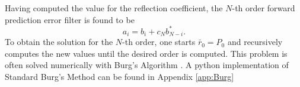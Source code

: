 \documentclass[twocolumn,showpacs,preprintnumbers,nofootinbib,prd,
superscriptaddress,10pt]{revtex4-1}
\begin{document}
Having computed the value for the reflection coefficient, the $N$-th order forward prediction error filter is found to be 
\begin{equation}
    a_i = b_i + c_N b^*_{N - i}.
\end{equation}
To obtain the solution for the $N$-th order, one starts $\bar r_0 = P_0$ and recursively computes the new values until the desired order is computed. 
This problem is often solved numerically with Burg's Algorithm \cite{Vos}.
A python implementation of Standard Burg's Method can be found in Appendix \ref{app:Burg} 



	
	
\end{document}
